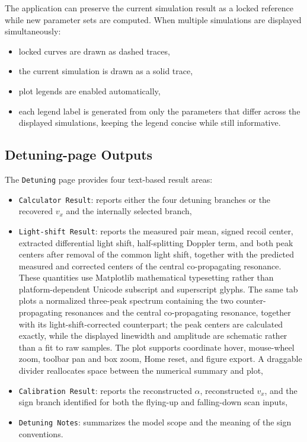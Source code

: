 \documentclass[11pt,a4paper]{article}
\begin{document}
The application can preserve the current simulation result as a locked reference while new
parameter sets are computed. When multiple simulations are displayed simultaneously:

\begin{itemize}
  \item locked curves are drawn as dashed traces,
  \item the current simulation is drawn as a solid trace,
  \item plot legends are enabled automatically,
  \item each legend label is generated from only the parameters that differ across the displayed
  simulations, keeping the legend concise while still informative.
\end{itemize}

\subsection{Detuning-page Outputs}

The \texttt{Detuning} page provides four text-based result areas:

\begin{itemize}
  \item \texttt{Calculator Result}: reports either the four detuning branches or the recovered
  $v_x$ and the internally selected branch,
  \item \texttt{Light-shift Result}: reports the measured pair mean, signed recoil center,
  extracted differential light shift, half-splitting Doppler term, and both peak centers after
  removal of the common light shift, together with the predicted measured and corrected centers
  of the central co-propagating resonance. These quantities use Matplotlib mathematical typesetting
  rather than platform-dependent Unicode subscript and superscript glyphs. The same tab plots a
  normalized three-peak spectrum containing the two counter-propagating resonances and the central
  co-propagating resonance, together with its light-shift-corrected counterpart; the peak centers are calculated exactly, while the
  displayed linewidth and amplitude are schematic rather than a fit to raw samples. The plot
  supports coordinate hover, mouse-wheel zoom, toolbar pan and box zoom, Home reset, and figure
  export. A draggable divider reallocates space between the numerical summary and plot,
  \item \texttt{Calibration Result}: reports the reconstructed $\alpha$, reconstructed $v_x$, and
  the sign branch identified for both the flying-up and falling-down scan inputs,
  \item \texttt{Detuning Notes}: summarizes the model scope and the meaning of the sign
  conventions.
\end{itemize}
\end{document}
